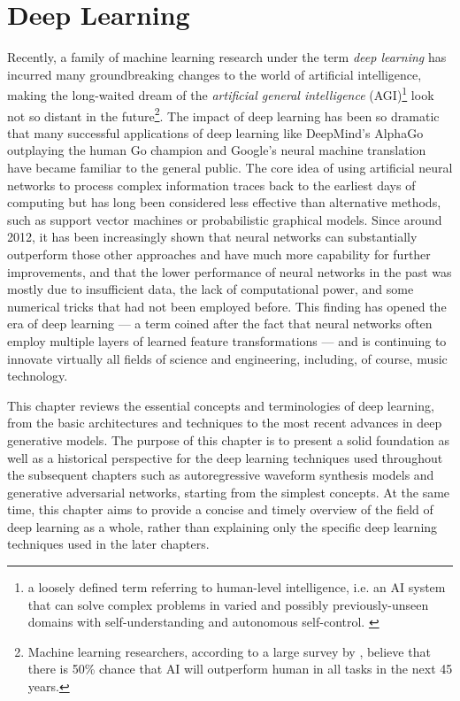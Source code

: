 
\graphicspath{{3-deeplearning/figures/}}

\chapter{Deep Learning}\label{sec:deeplearning}
\label{ch:deeplearning}

Recently, a family of machine learning research under the term \emph{deep learning} has incurred many groundbreaking changes to the world of artificial intelligence, making the long-waited dream of the \emph{artificial general intelligence} (AGI)\footnote{a loosely defined term referring to human-level intelligence, i.e. an AI system that can solve complex problems in varied and possibly previously-unseen domains with self-understanding and autonomous self-control. \cite{goertzel2007agi}} look not so distant in the future\footnote{Machine learning researchers, according to a large survey by , believe that there is 50\% chance that AI will outperform human in all tasks in the next 45 years.}.
The impact of deep learning has been so dramatic that many successful applications of deep learning like DeepMind's AlphaGo outplaying the human Go champion and Google's neural machine translation have became familiar to the general public.
The core idea of using artificial neural networks to process complex information traces back to the earliest days of computing \cite{kleene1951representation} but has long been considered less effective than alternative methods, such as support vector machines or probabilistic graphical models.
Since around 2012, it has been increasingly shown that neural networks can substantially outperform those other approaches and have much more capability for further improvements, and that the lower performance of neural networks in the past was mostly due to insufficient data, the lack of computational power, and some numerical tricks that had not been employed before.
This finding has opened the era of deep learning --- a term coined after the fact that neural networks often employ multiple layers of learned feature transformations --- and is continuing to innovate virtually all fields of science and engineering, including, of course, music technology.

This chapter reviews the essential concepts and terminologies of deep learning, from the basic architectures and techniques to the most recent advances in deep generative models.
The purpose of this chapter is to present a solid foundation as well as a historical perspective for the deep learning techniques used throughout the subsequent chapters such as autoregressive waveform synthesis models and generative adversarial networks, starting from the simplest concepts.
At the same time, this chapter aims to provide a concise and timely overview of the field of deep learning as a whole, rather than explaining only the specific deep learning techniques used in the later chapters.


